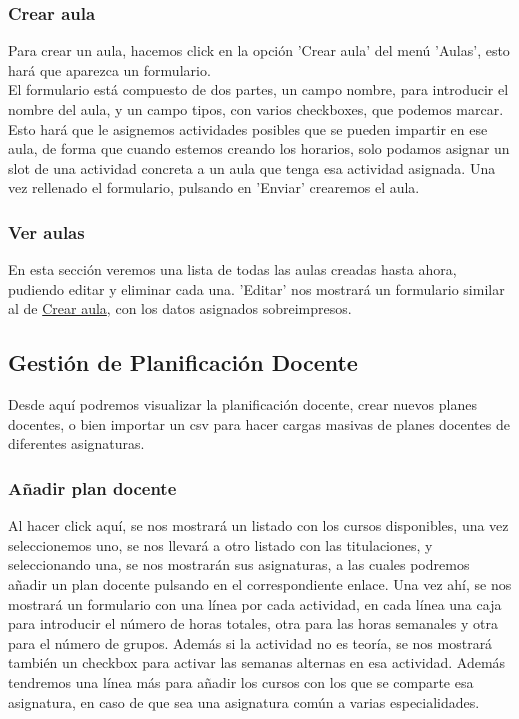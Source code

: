 \subsubsection{Crear aula}
\label{manual_crear_aula}
Para crear un aula, hacemos click en la opción 'Crear aula' del menú 'Aulas', esto hará que aparezca un formulario.\\

El formulario está compuesto de dos partes, un campo nombre, para introducir el nombre del aula, y un campo tipos, con varios checkboxes, que podemos marcar. Esto hará que le asignemos actividades posibles que se pueden impartir en ese aula, de forma que cuando estemos creando los horarios, solo podamos asignar un slot de una actividad concreta a un aula que tenga esa actividad asignada. Una vez rellenado el formulario, pulsando en 'Enviar' crearemos el aula.

\subsubsection{Ver aulas}

En esta sección veremos una lista de todas las aulas creadas hasta ahora, pudiendo editar y eliminar cada una. 'Editar' nos mostrará un formulario similar al de \hyperref[manual_crear_aula]{Crear aula}, con los datos asignados sobreimpresos.


\subsection{Gestión de Planificación Docente}

Desde aquí podremos visualizar la planificación docente, crear nuevos planes docentes, o bien importar un csv para hacer cargas masivas de planes docentes de diferentes asignaturas.

\subsubsection{Añadir plan docente}
Al hacer click aquí, se nos mostrará un listado con los cursos disponibles, una vez seleccionemos uno, se nos llevará a otro listado con las titulaciones, y seleccionando una, se nos mostrarán sus asignaturas, a las cuales podremos añadir un plan docente pulsando en el correspondiente enlace. Una vez ahí, se nos mostrará un formulario con una línea por cada actividad, en cada línea una caja para introducir el número de horas totales, otra para las horas semanales y otra para el número de grupos. Además si la actividad no es teoría, se nos mostrará también un checkbox para activar las semanas alternas en esa actividad.
Además tendremos una línea más para añadir los cursos con los que se comparte esa asignatura, en caso de que sea una asignatura común a varias especialidades.\\

